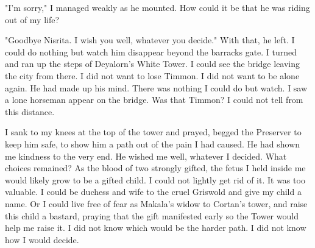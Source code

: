 \documentclass{article}
\begin{document}
"I'm sorry," I managed weakly as he mounted. How could it be that he was riding out of my life?

"Goodbye Nisrita. I wish you well, whatever you decide." With that, he left. I could do nothing but watch him disappear beyond the barracks gate. I turned and ran up the steps of Deyalorn's White Tower. I could see the bridge leaving the city from there. I did not want to lose Timmon. I did not want to be alone again. He had made up his mind. There was nothing I could do but watch. I saw a lone horseman appear on the bridge. Was that Timmon? I could not tell from this distance. 

I sank to my knees at the top of the tower and prayed, begged the Preserver to keep him safe, to show him a path out of the pain I had caused. He had shown me kindness to the very end. He wished me well, whatever I decided. What choices remained? As the blood of two strongly gifted, the fetus I held inside me would likely grow to be a gifted child. I could not lightly get rid of it. It was too valuable. I could be duchess and wife to the cruel Griswold and give my child a name. Or I could live free of fear as Makala's widow to Cortan's tower, and raise this child a bastard, praying that the gift manifested early so the Tower would help me raise it. I did not know which would be the harder path. I did not know how I would decide.
\end{document}
